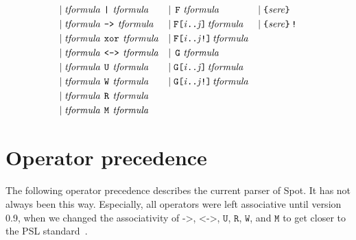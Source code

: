 \documentclass[a4paper,twoside,10pt,DIV=12]{scrreprt}
\DeclareMathOperator{\F}{\texttt{F}}
\newcommand{\FREP}[1]{\texttt{F[#1]}}
\newcommand{\StrongFREP}[1]{\texttt{F[#1!]}}
\DeclareMathOperator{\G}{\texttt{G}}
\newcommand{\GREP}[1]{\texttt{G[#1]}}
\newcommand{\StrongGREP}[1]{\texttt{G[#1!]}}
\newcommand{\U}{\mathbin{\texttt{U}}}
\newcommand{\R}{\mathbin{\texttt{R}}}
\newcommand{\M}{\mathbin{\texttt{M}}}
\newcommand{\W}{\mathbin{\texttt{W}}}
\DeclareMathOperator{\NOT}{\texttt{!}}
\newcommand{\XOR}{\mathbin{\texttt{xor}}}
\newcommand{\IMPLIES}{\mathbin{\texttt{->}}}
\newcommand{\EQUIV}{\mathbin{\texttt{<->}}}
\newcommand{\OR}{\mathbin{\texttt{|}}}
\newcommand{\0}{\texttt{0}}
\newcommand{\1}{\texttt{1}}
\newcommand\mvar[1]{\ensuremath{\mathit{#1}}}
\newcommand\tsamp[1]{\text{\texttt{#1}}}
\newcommand\msamp[1]{#1}
\begin{document}
\begin{align*}
 \mid{}                     & \mathit{tformula}\,\msamp{\OR}\,\mathit{tformula}      & \mid{} & \msamp{\F}\,\mathit{tformula}                              & \mid{} & \tsamp{\{}\mathit{sere}\tsamp{\}}                                        \\
 \mid{}                     & \mathit{tformula}\,\msamp{\IMPLIES}\,\mathit{tformula} & \mid{} & \msamp{\FREP{\mvar{i}..\mvar{j}}}\,\mathit{tformula}       & \mid{} & \tsamp{\{}\mathit{sere}\tsamp{\}}\msamp{\NOT}                            \\
 \mid{}                     & \mathit{tformula}\,\msamp{\XOR}\,\mathit{tformula}     & \mid{} & \msamp{\StrongFREP{\mvar{i}..\mvar{j}}}\,\mathit{tformula}                                                                                     \\
 \mid{}                     & \mathit{tformula}\,\msamp{\EQUIV}\,\mathit{tformula}   & \mid{} & \msamp{\G}\,\mathit{tformula}                                                                                                                  \\
 \mid{}                     & \mathit{tformula}\,\msamp{\U}\,\mathit{tformula}       & \mid{} & \msamp{\GREP{\mvar{i}..\mvar{j}}}\,\mathit{tformula}                                                                                           \\
 \mid{}                     & \mathit{tformula}\,\msamp{\W}\,\mathit{tformula}       & \mid{} & \msamp{\StrongGREP{\mvar{i}..\mvar{j}}}\,\mathit{tformula}                                                                                     \\
 \mid{}                     & \mathit{tformula}\,\msamp{\R}\,\mathit{tformula}                                                                                                                                                                 \\
 \mid{}                     & \mathit{tformula}\,\msamp{\M}\,\mathit{tformula}
\end{align*}

\section{Operator precedence}

The following operator precedence describes the current parser of
Spot.  It has not always been this way.  Especially, all operators
were left associative until version 0.9, when we changed the
associativity of $\IMPLIES$, $\EQUIV$, $\U$, $\R$, $\W$, and $\M$ to get closer
to the PSL standard~\cite{psl.04.lrm,eisner.06.psl}.
\end{document}
